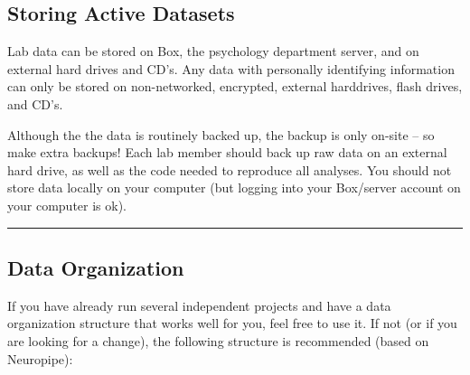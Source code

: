 \documentclass[]{book}
\begin{document}
\hypertarget{storing-active-datasets}{%
\subsection{Storing Active Datasets}\label{storing-active-datasets}}

Lab data can be stored on Box, the psychology department server, and on external hard drives and CD's. Any data with personally identifying information can only be stored on non-networked, encrypted, external harddrives, flash drives, and CD's.

Although the the data is routinely backed up, the backup is only on-site -- so make extra backups! Each lab member should back up raw data on an external hard drive, as well as the code needed to reproduce all analyses. You should not store data locally on your computer (but logging into your Box/server account on your computer is ok).

\begin{center}\rule{0.5\linewidth}{\linethickness}\end{center}

\hypertarget{data-organization}{%
\subsection{Data Organization}\label{data-organization}}

If you have already run several independent projects and have a data organization structure that works well for you, feel free to use it. If not (or if you are looking for a change), the following structure is recommended (based on Neuropipe):
\end{document}
